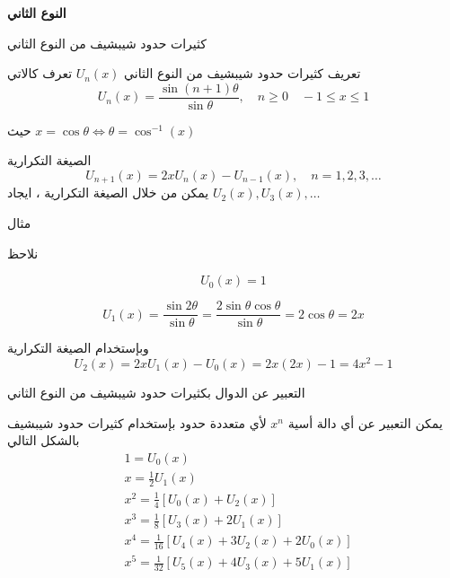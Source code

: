 	
		\begin{frame}
		\begin{center}
			\Huge
			\textbf{النوع الثاني}
		\end{center}
	\end{frame}
	
	\begin{frame}{كثيرات حدود شيبشيف من النوع الثاني}
		\begin{exampleblock}{تعريف}
				كثيرات حدود شيبشيف من النوع الثاني $U_n(x)$ تعرف كالاتي
			\begin{equation}
							U_n(x) = \frac{\sin(n+1)\theta}{\sin\theta},\quad n\geq 0 \quad -1 \leq x \leq 1
			\end{equation}

			
			حيث $x=\cos\theta \iff \theta = \cos^{-1}(x)$
		\end{exampleblock}
		
		\pause
		\begin{exampleblock}{الصيغة التكرارية}
			$$
				U_{n+1}(x) = 2x U_n(x) - U_{n-1}(x), \quad n = 1,2,3,\dots
		$$
	يمكن من خلال الصيغة التكرارية ، ايجاد $U_2(x), U_3(x), \dots$
		\end{exampleblock}
	\end{frame}
	
	\begin{frame}{}
		\begin{exampleblock}{مثال}
			
			\pause
			نلاحظ
			
			\pause
			\[
			U_0(x) = 1
			\]
			
			\pause
			\[
			 U_1(x) = \frac{\sin2\theta}{\sin\theta} = \frac{2\sin \theta\cos\theta}{\sin\theta}= 2\cos\theta=2x
			\]
			
			\pause
			وبإستخدام الصيغة التكرارية
			\[
				U_2(x) = 2x U_1(x) - U_0(x) = 2x(2x) - 1 = 4x^2 - 1
			\]
		\end{exampleblock}
	\end{frame}
	

	
		\begin{frame}{التعبير عن الدوال  بكثيرات حدود شيبشيف من النوع الثاني}  
			
			\pause
			يمكن التعبير عن أي دالة أسية $x^n$ لأي متعددة حدود بإستخدام كثيرات حدود شيبشيف بالشكل التالي
			\begin{align*}
				&1 = U_0(x)\\
				&x = \frac{1}{2}U_1(x)\\
				&x^2 = \frac{1}{4} [U_0(x) + U_2(x)]\\
				&x^3 = \frac{1}{8} [U_3(x) + 2U_1(x)]\\
				&x^4 = \frac{1}{16}[U_4(x) + 3U_2(x) + 2U_0(x)]\\
				&x^5 = \frac{1}{32} [U_5(x) + 4U_3(x) + 5U_1(x) ]
			\end{align*}
	\end{frame}
	
